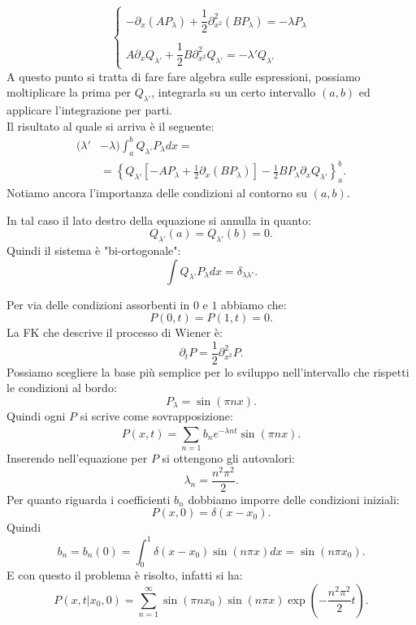 \begin{equation}
    \begin{cases}
	-\partial_{x}(AP_\lambda) + \dfrac{1}{2}\partial^2_{x^2}(BP_\lambda) = -\lambda P_\lambda\\
	\\
	A\partial_{x}Q_{\lambda'} + \dfrac{1}{2}B\partial^2_{x^2}Q_{\lambda'} = - \lambda'Q_{\lambda'}
    \end{cases}
\end{equation}
A questo punto si tratta di fare fare algebra sulle espressioni, possiamo moltiplicare la prima per $Q_{\lambda'}$, integrarla su un certo intervallo $(a,b)$  ed applicare l'integrazione per parti.\\
Il risultato al quale si arriva è il seguente:
\[\begin{aligned}
    (\lambda'&-\lambda) \int_{a}^{b} Q_{\lambda'}P_{\lambda}dx = \\
             &= \left\{Q_{\lambda'}\left[-AP_\lambda  + \frac{1}{2}\partial_{x}(BP_\lambda) \right] -
		       \frac{1}{2}BP_{\lambda}\partial_{x}Q_{\lambda'}\right\}_{a}^{b}
.\end{aligned}\]
Notiamo ancora l'importanza delle condizioni al contorno su $(a,b)$. 
\begin{exmp}
    In tal caso il lato destro della equazione si annulla in quanto:
    \[
	Q_{\lambda'}(a) = Q_{\lambda'}(b) = 0
    .\] 
    Quindi il sistema è "bi-ortogonale":
    \[
        \int Q_{\lambda'}P_{\lambda}dx = \delta_{\lambda\lambda'}
    .\] 
\end{exmp}
\noindent
\begin{exmp}
    Per via delle condizioni assorbenti in $0$ e $1$ abbiamo che:
    \[
	P(0,t) = P(1,t) = 0
    .\] 
    La FK che descrive il processo di Wiener è:
    \[
        \partial_{t}P = \frac{1}{2}\partial^2_{x^2}P
    .\] 
    Possiamo scegliere la base più semplice per lo sviluppo nell'intervallo che rispetti le condizioni al bordo:
    \[
	P_\lambda =\sin (\pi n x) 
    .\] 
    Quindi ogni $P$ si scrive come sovrapposizione:
    \[
	P(x,t) = \sum_{n=1}^{} b_n e^{-\lambda n t}\sin (\pi n x) 
    .\] 
    Inserendo nell'equazione per $P$  si ottengono gli autovalori:
    \[
        \lambda_n = \frac{n^2\pi^2}{2}
    .\] 
    Per quanto riguarda i coefficienti $b_n$  dobbiamo imporre delle condizioni iniziali:
    \[
	P(x,0) = \delta (x-x_0) 
    .\] 
    Quindi
    \[
	b_n = b_n(0) = \int_{0}^{1} \delta (x-x_0) \sin (n\pi x)  dx = \sin (n\pi x_0) 
    .\] 
    E con questo il problema è risolto, infatti si ha:
    \[
	P(x,t|x_0, 0) = \sum_{n=1}^{\infty} \sin (\pi nx_0) \sin (n\pi x) \exp\left(-\frac{n^2\pi^2 }{2}t\right)
    .\] 
\end{exmp}
